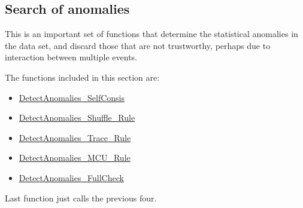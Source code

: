 \subsection{Search of anomalies}\label{Subsec:SearchOfAnomalies}

This is an important set of functions that determine the statistical anomalies in the data set, and discard those that are not trustworthy, perhaps due to interaction between multiple events. 

The functions included in this section are:

\begin{itemize}
	\item  \hyperref[Fun:DetectAnomaliesSelfConsis]{DetectAnomalies\_SelfConsis}
	\item  \hyperref[Fun:DetectAnomaliesShuffleRule]{DetectAnomalies\_Shuffle\_Rule}
	\item  \hyperref[Fun:DetectAnomaliesTraceRule]{DetectAnomalies\_Trace\_Rule}
	\item  \hyperref[Fun:DetectAnomaliesMCURule]{DetectAnomalies\_MCU\_Rule}
	\item  \hyperref[Fun:DetectAnomaliesFullCheck]{DetectAnomalies\_FullCheck}
\end{itemize}

Last function just calls the previous four.

